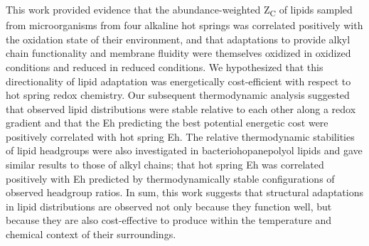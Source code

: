 This work provided evidence that the abundance-weighted Z\textsubscript{C} of lipids sampled from microorganisms from four alkaline hot springs was correlated positively with the oxidation state of their environment, and that adaptations to provide alkyl chain functionality and membrane fluidity were themselves oxidized in oxidized conditions and reduced in reduced conditions. We hypothesized that this directionality of lipid adaptation was energetically cost-efficient with respect to hot spring redox chemistry. Our subsequent thermodynamic analysis suggested that observed lipid distributions were stable relative to each other along a redox gradient and that the Eh predicting the best potential energetic cost were positively correlated with hot spring Eh. The relative thermodynamic stabilities of lipid headgroups were also investigated in bacteriohopanepolyol lipids and gave similar results to those of alkyl chains; that hot spring Eh was correlated positively with Eh predicted by thermodynamically stable configurations of observed headgroup ratios. In sum, this work suggests that structural adaptations in lipid distributions are observed not only because they function well, but because they are also cost-effective to produce within the temperature and chemical context of their surroundings.